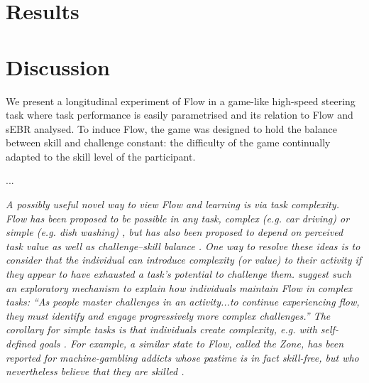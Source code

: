 \documentclass[10pt,letterpaper,floatsintext]{article}
\begin{document}

\section{Results}



\section{Discussion}
We present a longitudinal experiment of Flow in a game-like high-speed steering task where task performance is easily parametrised and its relation to Flow and sEBR analysed. %
To induce Flow, the game was designed to hold the balance between skill and challenge constant: the difficulty of the game continually adapted to the skill level of the participant.

...

{\it A possibly useful novel way to view Flow and learning is via task complexity. Flow has been proposed to be possible in {\it any} task, complex (e.g. car driving) or simple (e.g. dish washing) \cite{Csikszentmihalyi1999}, but has also been proposed to depend on perceived task value as well as challenge--skill balance \cite{Keller2012}. One way to resolve these ideas is to consider that the individual can {\it introduce} complexity (or value) to their activity if they appear to have exhausted a task's potential to challenge them. \cite{Nakamura2002} suggest such an exploratory mechanism to explain how individuals maintain Flow in complex tasks: ``As people master challenges in an activity...to continue experiencing flow, they must identify and engage progressively more complex challenges.'' The corollary for simple tasks is that individuals {\it create} complexity, e.g. with self-defined goals \cite{Rauterberg1995}. For example, a similar state to Flow, called the Zone, has been reported for machine-gambling addicts whose pastime is in fact skill-free, but who nevertheless believe that they are skilled \cite{Schull2014}.}
\end{document}
